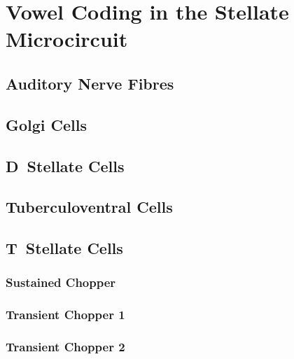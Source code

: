 
\section{Vowel Coding in the Stellate Microcircuit}

\subsection{Auditory Nerve Fibres}

\subsection{Golgi Cells}

\subsection{D~Stellate Cells}

\subsection{Tuberculoventral Cells}

\subsection{T~Stellate Cells}

\subsubsection{Sustained Chopper}

\subsubsection{Transient Chopper 1}

\subsubsection{Transient Chopper 2}

